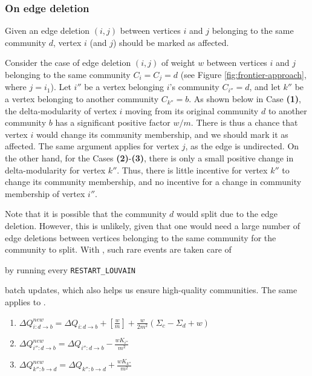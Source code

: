 




\subsubsection{On edge deletion}

\begin{lemma}
\label{thm:louvain--mark-deletion}
Given an edge deletion $(i, j)$ between vertices $i$ and $j$ belonging to the same community $d$, vertex $i$ (and $j$) should be marked as affected.
\end{lemma}

Consider the case of edge deletion $(i, j)$ of weight $w$ between vertices $i$ and $j$ belonging to the same community $C_i = C_j = d$ (see Figure \ref{fig:frontier-approach}, where $j = i_1$). Let $i''$ be a vertex belonging $i$'s community $C_{i''} = d$, and let $k''$ be a vertex belonging to another community $C_{k''} = b$. As shown below in Case \textbf{(1)}, the delta-modularity of vertex $i$ moving from its original community $d$ to another community $b$ has a significant positive factor $w/m$. There is thus a chance that vertex $i$ would change its community membership, and we should mark it as affected. The same argument applies for vertex $j$, as the edge is undirected. On the other hand, for the Cases \textbf{(2)}-\textbf{(3)}, there is only a small positive change in delta-modularity for vertex $k''$. Thus, there is little incentive for vertex $k''$ to change its community membership, and no incentive for a change in community membership of vertex $i''$.

Note that it is possible that the community $d$ would split due to the edge deletion. However, this is unlikely, given that one would need a large number of edge deletions between vertices belonging to the same community for the community to split. With \FroLou{}, such rare events are taken care of by running \StaLou{} every \verb|RESTART_LOUVAIN| batch updates, which also helps us ensure high-quality communities. The same applies to \DelLou{}.

\begin{enumerate}
  \item $\Delta Q_{i:d \rightarrow b}^{new} = \Delta Q_{i:d \rightarrow b} + [\frac{w}{m}] + \frac{w}{2m^2} (\Sigma_c - \Sigma_d + w)$
  \item $\Delta Q_{i'':d \rightarrow b}^{new} = \Delta Q_{i'':d \rightarrow b} - \frac{wK_{i''}}{m^2}$
  \item $\Delta Q_{k'':b \rightarrow d}^{new} = \Delta Q_{k'':b \rightarrow d} + \frac{wK_{k''}}{m^2}$
\end{enumerate}

